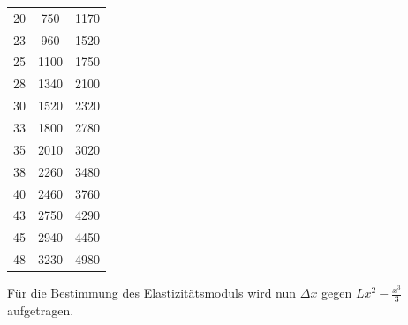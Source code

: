 \begin{table}[H]
\begin{tabular}{S[table-format=2.0] S[table-format=4.0] S[table-format=4.0]}
    20                                         & 750                                                & 1170                                                 \\
    23                                         & 960                                                & 1520                                                 \\
    25                                         & 1100                                               & 1750                                                 \\
    28                                         & 1340                                               & 2100                                                 \\
    30                                         & 1520                                               & 2320                                                 \\
    33                                         & 1800                                               & 2780                                                 \\
    35                                         & 2010                                               & 3020                                                 \\
    38                                         & 2260                                               & 3480                                                 \\
    40                                         & 2460                                               & 3760                                                 \\
    43                                         & 2750                                               & 4290                                                 \\
    45                                         & 2940                                               & 4450                                                 \\
    48                                         & 3230                                               & 4980                                                 \\
    \bottomrule
  \end{tabular}
\end{table}
Für die Bestimmung des Elastizitätsmoduls wird nun $\Delta x$ gegen $Lx^2 -\frac{x^3}{3}$ aufgetragen.
